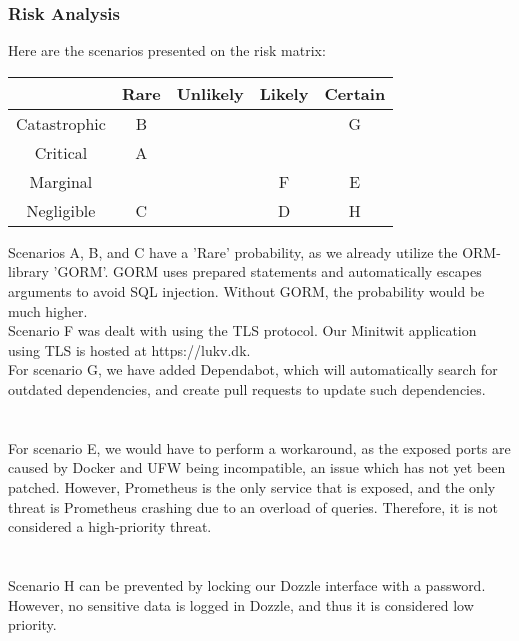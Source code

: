 \subsubsection{Risk Analysis}
Here are the scenarios presented on the risk matrix:
\begin{center}
\begin{tabular}{ |c|c|c|c|c| } 
 \hline
  & Rare & Unlikely & Likely & Certain \\ 
 \hline
 Catastrophic & B &  &  & G\\ 
 \hline
 Critical & A &  &  & \\ 
 \hline
 Marginal & &  &  F& E\\ 
 \hline
 Negligible & C &  & D & H\\ 
 \hline
\end{tabular}
\end{center}
Scenarios A, B, and C have a 'Rare' probability, as we already utilize the ORM-library 'GORM'. GORM uses prepared statements and automatically escapes arguments to avoid SQL injection. Without GORM, the probability would be much higher.\\
Scenario F was dealt with using the TLS protocol. Our Minitwit application using TLS is hosted at https://lukv.dk.\\
For scenario G, we have added Dependabot, which will automatically search for outdated dependencies, and create pull requests to update such dependencies.
\\\\
\\
For scenario E, we would have to perform a workaround, as the exposed ports are caused by Docker and UFW being incompatible, an issue which has not yet been patched. However, Prometheus is the only service that is exposed, and the only threat is Prometheus crashing due to an overload of queries. Therefore, it is not considered a high-priority threat.
\\\\
\\
Scenario H can be prevented by locking our Dozzle interface with a password. However, no sensitive data is logged in Dozzle, and thus it is considered low priority.